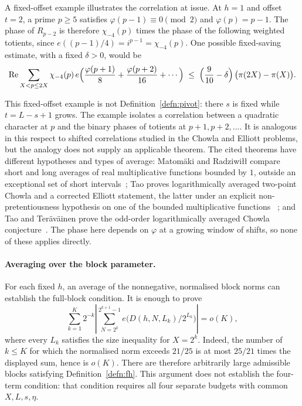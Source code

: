 \documentclass[11pt]{article}
\theoremstyle{plain}
\theoremstyle{definition}
\theoremstyle{remark}
\begin{document}
A fixed-offset example illustrates the correlation at issue. At $h=1$
and offset $t=2$, a prime $p\ge5$ satisfies $\varphi(p-1)\equiv0\pmod2$
and $\varphi(p)=p-1$. The phase of $R_{p-2}$ is therefore
$\chi_{-4}(p)$ times the phase of the following weighted totients, since
$e((p-1)/4)=i^{p-1}=\chi_{-4}(p)$. One possible fixed-saving estimate,
with a fixed $\delta>0$, would be
\[
  \operatorname{Re}\sum_{X<p\le 2X}\chi_{-4}(p)\,
    e\Bigl(\frac{\varphi(p+1)}{8}+\frac{\varphi(p+2)}{16}+\cdots\Bigr)
  \;\le\;\Bigl(\frac{9}{10}-\delta\Bigr)\,\bigl(\pi(2X)-\pi(X)\bigr).
\]

This fixed-offset example is not Definition~\ref{defn:pivot}: there $s$
is fixed while $t=L-s+1$ grows. The example isolates a correlation between
a quadratic character at $p$ and the binary phases of totients at
$p+1,p+2,\ldots$. It is analogous in this respect to shifted correlations
studied in the Chowla and Elliott problems, but the analogy does not
supply an applicable theorem. The cited theorems have different hypotheses and types of average: Matom\"aki and Radziwi\l{}\l{} compare short and long averages of
real multiplicative functions bounded by $1$, outside an exceptional set of
short intervals~\cite[Theorem~1]{matomaki-radziwill}; Tao proves logarithmically averaged two-point Chowla and a corrected
Elliott statement, the latter under an explicit non-pretentiousness
hypothesis on one of the bounded multiplicative functions
~\cite[Theorems~1.2--1.3]{tao-elliott}; and Tao and Ter\"av\"ainen
prove the odd-order logarithmically averaged Chowla
conjecture~\cite[Theorem~1.1]{tao-teravainen}. The phase here
depends on $\varphi$ at a growing window of shifts, so none of these applies
directly.

\paragraph{Averaging over the block parameter.}
For each fixed $h$, an average of the nonnegative, normalised block norms
can establish the full-block condition. It is enough to prove
\[
 \sum_{k=1}^{K}2^{-k}
 \left|\sum_{N=2^k}^{2^{k+1}-1}
       e\bigl(D(h,N,L_k)/2^{L_k}\bigr)\right|=o(K),
\]
where every $L_k$ satisfies the size inequality for $X=2^k$.
Indeed, the number of $k\le K$ for which the normalised norm exceeds
$21/25$ is at most $25/21$ times the displayed sum, hence is $o(K)$.
There are therefore arbitrarily large admissible blocks satisfying
Definition~\ref{defn:fh}. This argument does not establish the four-term
condition: that condition requires all four separate budgets with common
$X,L,s,\eta$.
\end{document}
